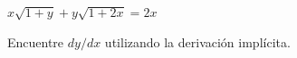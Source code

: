 \item $x\sqrt{1 + y} + y\sqrt{1 + 2x} = 2x$
\par
Encuentre $dy/dx$ utilizando la derivación implícita.
